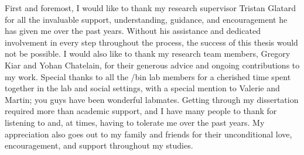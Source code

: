 \begin{acknowledgments}

  First and foremost, I would like to thank my research supervisor Tristan Glatard for all the invaluable support, understanding,
  guidance, and encouragement he has given me over the past years.
  Without his assistance and dedicated involvement in every step throughout the process, the success of this thesis would not be possible.
  I would also like to thank my research team members, Gregory Kiar and Yohan Chatelain, for their generous advice and ongoing contributions to my work.
  Special thanks to all the /bin lab members for a cherished time spent together in the lab and social settings,
  with a special mention to Valerie and Martin; you guys have been wonderful labmates.
  Getting through my dissertation required more than academic support, and I have many people to thank for listening to and, at times, 
  having to tolerate me over the past years. 
  My appreciation also goes out to my family and friends for their unconditional love, encouragement, and support throughout my studies.

\end{acknowledgments}